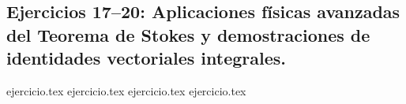 \subsection*{Ejercicios 17--20: Aplicaciones físicas avanzadas del Teorema de Stokes y demostraciones de identidades vectoriales integrales.}
\begin{enumerate}
    \setcounter{enumi}{16}
    {ejercicio.tex}
    {ejercicio.tex}
    {ejercicio.tex}
    {ejercicio.tex}
\end{enumerate}

